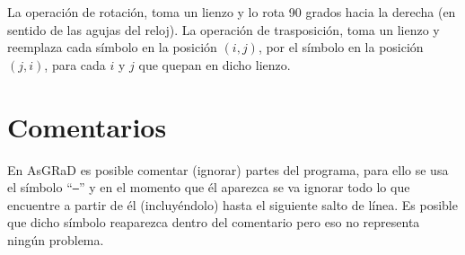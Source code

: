 \documentclass[letterpaper,11pt]{article}
\newcommand{\asgrad}{AsGRaD\xspace}
\newcommand{\qt}[1]{``\texttt{#1}''}
\begin{document}
La operación de rotación, toma un lienzo y lo rota 90 grados hacia la derecha (en sentido de las agujas del reloj). La operación de trasposición, toma un lienzo y reemplaza cada símbolo en la posición $(i, j)$, por el símbolo en la posición $(j, i)$, para cada $i$ y $j$ que quepan en dicho lienzo.

\section{Comentarios}

En \asgrad es posible comentar (ignorar) partes del programa, para ello se usa el símbolo \qt{--} y en el momento que él aparezca se va ignorar todo lo que encuentre a partir de él (incluyéndolo) hasta el siguiente salto de línea. Es posible que dicho símbolo reaparezca dentro del comentario pero eso no representa ningún problema.
\end{document}
